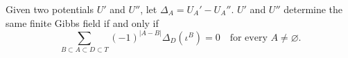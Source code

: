 Given two potentials $U'$ and $U''$, let $\Delta_A = U_A' - U_A''$. $U'$ and $U''$ determine the same finite Gibbs field if and only if
$$\sum_{B \subset A \subset D \subset T} (-1)^{|A - B|} \Delta_D(\iota^B) = 0 \quad \text{for every } A \neq \varnothing.$$
